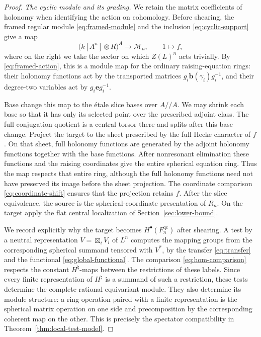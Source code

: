 \documentclass[11pt]{article}
\numberwithin{equation}{section}
\theoremstyle{definition}
\theoremstyle{remark}
\begin{document}
\begin{proof}
\emph{The cyclic module and its grading.}
We retain the matrix coefficients of holonomy when identifying the
action on cohomology.  Before shearing, the framed regular module
\eqref{eq:framed-module} and the inclusion \eqref{eq:cyclic-support}
give a map
\begin{equation}\label{boundary:unsheared-cyclic-map}
 \bigl(k[A^n]\otimes R\bigr)^A\longrightarrow\mathcal M_n,
 \qquad 1\longmapsto f,
\end{equation}
where on the right we take the sector on which $Z(L)^n$ acts trivially.
By \eqref{eq:framed-action}, this is a module map for the ordinary
raising-equation rings: their holonomy functions act by the transported
matrices $g_i\mathbf b(\gamma_i)g_i^{-1}$, and their degree-two variables
act by $g_i\mathbf e g_i^{-1}$.

Base change this map to the \'etale slice bases over $A/\!/A$.  We may
shrink each base so that it has only its selected point over the
prescribed adjoint class.  The full conjugation quotient is a central
torsor there and splits after this base change.  Project the target to
the sheet prescribed by the full Hecke character of $f$.  On that
sheet, full holonomy functions are generated by the adjoint holonomy
functions together with the base functions.  After nonresonant
elimination these functions and the raising coordinates give the entire
spherical equation ring.  Thus the map respects that entire ring,
although the full holonomy functions need not have preserved its image
before the sheet projection.  The coordinate comparison
\eqref{eq:coordinate-shift} ensures that the projection retains $f$.
After the slice equivalence, the source is the spherical-coordinate
presentation of $R_n$.  On the target apply the flat central
localization of Section~\ref{sec:lower-bound}.

We record explicitly why the target becomes $H^\bullet(F_n^{\mathrm{qc}})$
after shearing.  A test by a neutral representation
$V=\boxtimes_iV_i$ of $L^n$ computes the mapping groups from the
corresponding spherical summand tensored with $V^*$, by the transfer
\eqref{eq:transfer} and the functional \eqref{eq:global-functional}.
The comparison \eqref{eq:hom-comparison} respects the constant
$H^\natural$-maps between the restrictions of these labels.  Since every
finite representation of $H^\natural$ is a summand of such a restriction,
these tests determine the complete rational equivariant module.  They
also determine its module structure: a ring operation paired with a
finite representation is the spherical matrix operation on one side
and precomposition by the corresponding coherent map on the other.
This is precisely the spectator compatibility in
Theorem~\ref{thm:local-test-model}.


\end{proof}
\end{document}

